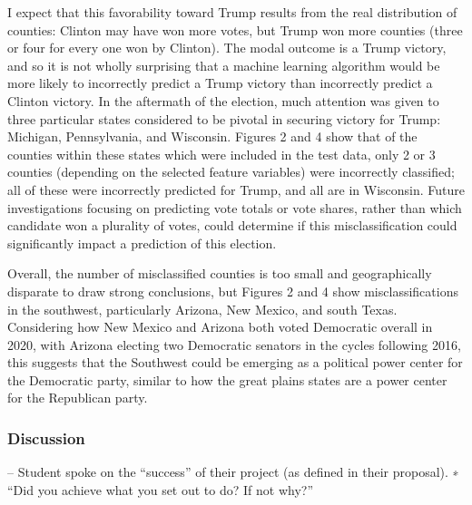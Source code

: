 \documentclass[11pt]{article}
\begin{document}
I expect that this favorability toward Trump results from the real
distribution of counties: Clinton may have won more votes, but Trump won
more counties (three or four for every one won by Clinton). The modal
outcome is a Trump victory, and so it is not wholly surprising that a
machine learning algorithm would be more likely to incorrectly predict a
Trump victory than incorrectly predict a Clinton victory. In the
aftermath of the election, much attention was given to three particular
states considered to be pivotal in securing victory for Trump: Michigan,
Pennsylvania, and Wisconsin. Figures 2 and 4 show that of the counties
within these states which were included in the test data, only 2 or 3
counties (depending on the selected feature variables) were incorrectly
classified; all of these were incorrectly predicted for Trump, and all
are in Wisconsin. Future investigations focusing on predicting vote
totals or vote shares, rather than which candidate won a plurality of
votes, could determine if this misclassification could significantly
impact a prediction of this election.

Overall, the number of misclassified counties is too small and
geographically disparate to draw strong conclusions, but Figures 2 and 4
show misclassifications in the southwest, particularly Arizona, New
Mexico, and south Texas. Considering how New Mexico and Arizona both
voted Democratic overall in 2020, with Arizona electing two Democratic
senators in the cycles following 2016, this suggests that the Southwest
could be emerging as a political power center for the Democratic party,
similar to how the great plains states are a power center for the
Republican party.

    \hypertarget{discussion}{%
\subsubsection{Discussion}\label{discussion}}

-- Student spoke on the ``success'' of their project (as defined in
their proposal). ∗ ``Did you achieve what you set out to do? If not
why?''
\end{document}
